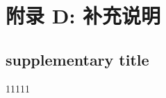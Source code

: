 \newpage
\section{附录 D: 补充说明}
\label{app:supplementary}

\subsection{supplementary title}
\label{sec:label of supplementary}

11111
